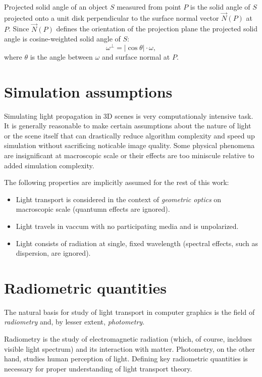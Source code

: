 \begin{df}
Projected solid angle \parencite{nicodemus1976} of an object $S$ measured from point $P$ is the solid angle of $S$ projected onto a unit disk perpendicular to the surface normal vector $\vec{N}(P)$ at $P$. Since $\vec{N}(P)$ defines the orientation of the projection plane the projected solid angle is cosine-weighted solid angle of $S$:
\begin{equation}
  \omega^{\perp} = |\cos\theta| \cdot \omega ,
\end{equation}
where $\theta$ is the angle between $\omega$ and surface normal at $P$.
\end{df}

\section{Simulation assumptions}
Simulating light propagation in 3D scenes is very computationaly intensive task. It is generally reasonable to make certain assumptions about the nature of light or the scene itself that can drastically reduce algorithm complexity and speed up simulation without sacrificing noticable image quality. Some physical phenomena are insignificant at macroscopic scale or their effects are too miniscule relative to added simulation complexity.

The following properties are implicitly assumed for the rest of this work:
\begin{itemize}
\item Light transport is considered in the context of \emph{geometric optics} on macroscopic scale (quantumn effects are ignored).
\item Light travels in vaccum with no participating media and is unpolarized.
\item Light consists of radiation at single, fixed wavelength (spectral effects, such as dispersion, are ignored).
\end{itemize}

\section{Radiometric quantities}
The natural basis for study of light transport in computer graphics is the field of \emph{radiometry} and, by lesser extent, \emph{photometry}.

Radiometry is the study of electromagnetic radiation (which, of course, incldues visible light spectrum) and its interaction with matter. Photometry, on the other hand, studies human perception of light. Defining key radiometric quantities is necessary for proper understanding of light transport theory.

